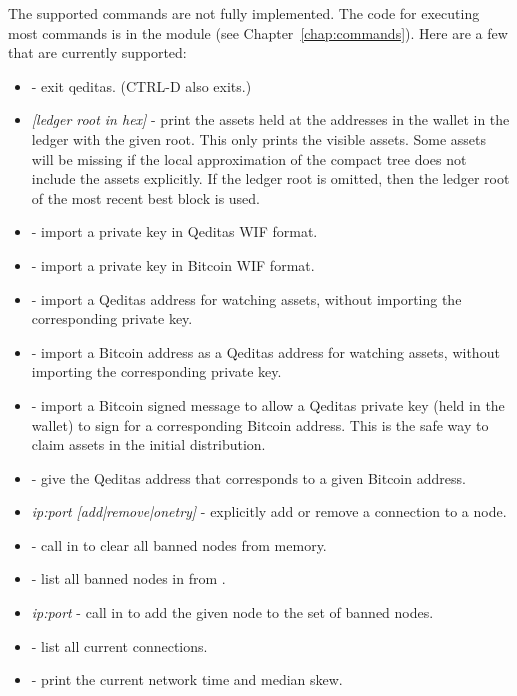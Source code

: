 {The supported commands are not fully implemented.
The code for executing most commands is in the {} module
(see Chapter~\ref{chap:commands}).
Here are a few that are currently supported:
\begin{itemize}
\item {} - exit qeditas. (CTRL-D also exits.)
\item {} {\it{[ledger root in hex]}} - print the assets held at the addresses in the wallet in the ledger with the given root. This only prints the visible assets. Some assets will be missing if the local approximation of the compact tree does not include the assets explicitly. If the ledger root is omitted, then the ledger root of the most recent best block is used.
\item {} - import a private key in Qeditas WIF format.
\item {} - import a private key in Bitcoin WIF format.
\item {} - import a Qeditas address for watching assets, without importing the corresponding private key.
\item {} - import a Bitcoin address as a Qeditas address for watching assets, without importing the corresponding private key.
\item {} - import a Bitcoin signed message to allow a Qeditas private key (held in the wallet) to sign for a corresponding Bitcoin address. This is the safe way to claim assets in the initial distribution.
\item {} - give the Qeditas address that corresponds to a given Bitcoin address.
\item {} {\it{ip:port}} {\it{[add|remove|onetry]}} - explicitly add or remove a connection to a node.
\item {} - call {} in {} to clear all banned nodes from memory.
\item {} - list all banned nodes in {} from {}.
\item {} {\it{ip:port}} - call {} in {} to add the given node to the set of banned nodes.
\item {} - list all current connections.
\item {} - print the current network time and median skew.

\end{itemize}}
